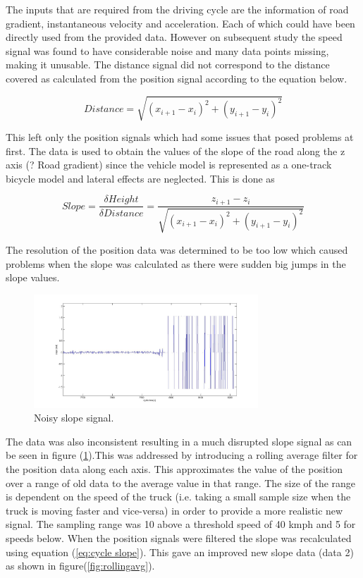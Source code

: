 \documentclass[ExampleMasters.tex]{subfiles}
\begin{document}
The inputs that are required from the driving cycle are the information of road gradient, instantaneous velocity and acceleration. Each of which could have been directly used from the provided data. However on subsequent study the speed signal was found to have considerable noise and many data points missing, making it unusable. The distance signal did not correspond to the distance covered as calculated from the position signal according to the equation below.

\begin{equation} \label{eq:cycle distance}
Distance = \sqrt{(x_{i+1} - x_i)^2 +(y_{i+1} - y_i)^2}
\end{equation}

This left only the position signals which had some issues that posed problems at first. The data is used to obtain the values of the slope of the road along the z axis (? Road gradient) since the vehicle model is represented as a one-track bicycle model and lateral effects are neglected. This is done as 

\begin{equation} \label{eq:cycle slope}
Slope =\frac{\delta Height}{\delta Distance} = \frac{z_{i+1} - z_i}{\sqrt{(x_{i+1}-x_i)^2 +(y_{i+1}-y_i)^2  }}
\end{equation}

The resolution of the position data was determined to be too low which caused problems when the slope was calculated as there were sudden big jumps in the slope values.

\begin{figure}[hb]
	\begin{center}
		\includegraphics[width=0.75\textwidth]{figures/VehicleModel/noise.jpg}
	\end{center}
	\caption{Noisy slope signal.}
	\label{fig:noise}
\end{figure}

The data was also inconsistent resulting in a much disrupted slope signal as can be seen in figure (\ref{fig:noise}).This was addressed by introducing a rolling average filter for the position data along each axis. This approximates the value of the position over a range of old data to the average value in that range. The size of the range is dependent on the speed of the truck (i.e. taking a small sample size when the truck is moving faster and vice-versa) in order to provide a more realistic new signal. The sampling range was 10 above a threshold speed of 40 kmph and 5 for speeds below. When the position signals were filtered the slope was recalculated using equation (\ref{eq:cycle slope}). This gave an improved new slope data (data 2) as shown in figure(\ref{fig:rollingavg}).
\end{document}
